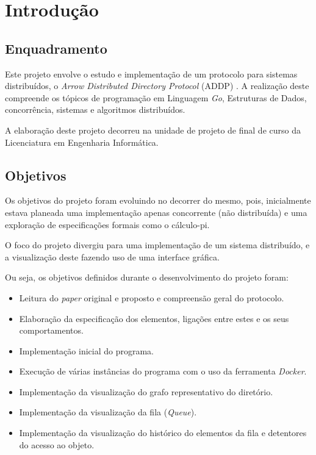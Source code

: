 \chapter{Introdução}
\label{chap:introducao}
\section{Enquadramento}
\label{introducao:sec:enquadramento}


Este projeto envolve o estudo e implementação de um protocolo para sistemas distribuídos, o \textit{Arrow Distributed Directory Protocol} (ADDP) \cite{Arrow}. 
A realização deste compreende os tópicos de programação em Linguagem \emph{Go}, Estruturas de Dados, concorrência, sistemas e algoritmos distribuídos.

A elaboração deste projeto decorreu na unidade de projeto de final de curso da Licenciatura em Engenharia Informática.



\section{Objetivos}
\label{introducao:sec:objetivos}


Os objetivos do projeto foram evoluindo no decorrer do mesmo, pois, inicialmente estava planeada uma implementação apenas concorrente (não distribuída) 
e uma exploração de especificações formais como o cálculo-pi. 

O foco do projeto divergiu para uma implementação de um sistema distribuído,
e a visualização deste fazendo uso de uma interface gráfica.

Ou seja, os objetivos definidos durante o desenvolvimento do projeto foram:

\begin{itemize}
    \item Leitura do \emph{paper} original e proposto e compreensão geral do protocolo.
    \item Elaboração da especificação dos elementos, ligações entre estes e os seus comportamentos.
    \item Implementação inicial do programa.
    \item Execução de várias instâncias do programa com o uso da ferramenta \emph{Docker}.
    \item Implementação da visualização do grafo representativo do diretório.
    \item Implementação da visualização da fila (\emph{Queue}).
    \item Implementação da visualização do histórico do elementos da fila e detentores do acesso ao objeto.

\end{itemize}

